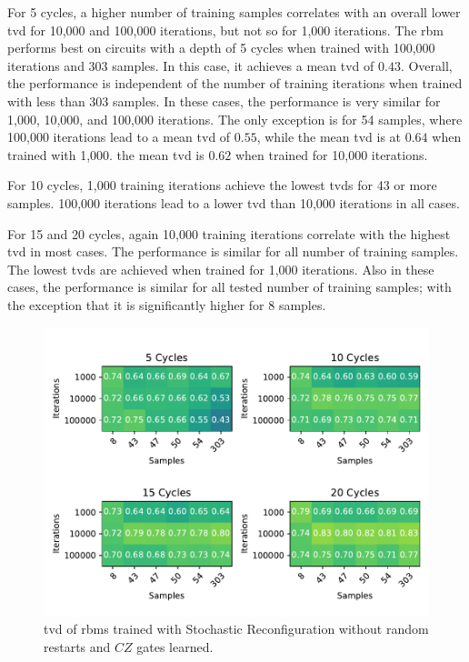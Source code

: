 For 5 cycles, a higher number of training samples 
correlates with an overall lower \gls{tvd} for 10,000 and 100,000 iterations, but not so for 1,000 iterations. The \gls{rbm} performs best on 
circuits with a depth of 5 cycles when trained with 100,000 iterations and 303 samples. In this case, 
it achieves a mean \gls{tvd} of $0.43$. Overall, the performance is independent of the number of 
training iterations when trained with less than 303 samples. In these cases, the performance is very 
similar for 1,000, 10,000, and 100,000 iterations. The only exception is for 54 samples, where 100,000 iterations lead to a 
mean \gls{tvd} of $0.55$, while the mean \gls{tvd} is at $0.64$ when trained with 1,000. the mean \gls{tvd} is $0.62$ when trained for 
10,000 iterations. 

For 10 cycles, 1,000 training iterations achieve the lowest \gls{tvd}s for 43 or more samples. 
100,000 iterations lead to a lower \gls{tvd} than 10,000 iterations in all cases. 

For 15 and 20 cycles, again 10,000 training iterations correlate with the highest \gls{tvd} in most cases.
The performance is similar for all number of training samples. The lowest \gls{tvd}s are achieved when trained for 1,000
iterations. Also in these cases, the performance is similar for all tested number of training samples; with 
the exception that it is significantly higher for 8 samples.

\begin{figure}[H]
  \centering
  \includegraphics[width=\textwidth]{figures/results/sr-no-restarts-learned/tvd_heatmap.pdf}
  \caption[TVD of RBMs Trained with Stochastic Reconfiguration without Random Restarts and $CZ$ Gates Learned]{
  \gls{tvd} of \gls{rbm}s trained with Stochastic Reconfiguration without random restarts and $CZ$ gates learned.}
  \label{fig:sr_no_restarts_tvd}
\end{figure}


